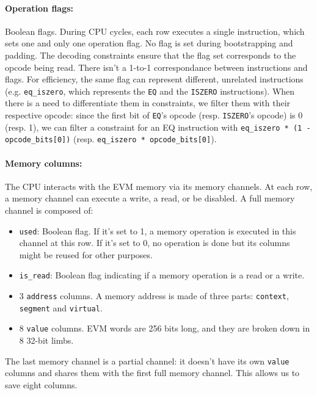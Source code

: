 \paragraph*{Operation flags:} Boolean flags. During CPU cycles, each row executes a single instruction, which sets one and only one operation flag. No flag is set during
bootstrapping and padding. The decoding constraints ensure that the flag set corresponds to the opcode being read.
There isn't a 1-to-1 correspondance between instructions and flags. For efficiency, the same flag can represent different, unrelated instructions (e.g. \texttt{eq\_iszero}, which represents
the \texttt{EQ} and the \texttt{ISZERO} instructions). When there is a need to differentiate them in constraints, we filter them with their respective opcode: since the first bit of \texttt{EQ}'s opcode
(resp. \texttt{ISZERO}'s opcode) is 0 (resp. 1), we can filter a constraint for an EQ instruction with \texttt{eq\_iszero * (1 - opcode\_bits[0])}
(resp. \texttt{eq\_iszero * opcode\_bits[0]}).

\paragraph*{Memory columns:} The CPU interacts with the EVM memory via its memory channels. At each row, a memory channel can execute a write, a read, or be disabled. A full memory channel is composed of:
\begin{itemize}
    \item  \texttt{used}: Boolean flag. If it's set to 1, a memory operation is executed in this channel at this row. If it's set to 0, no operation is done but its columns might be reused for other purposes.
    \item  \texttt{is\_read}: Boolean flag indicating if a memory operation is a read or a write.
    \item  3 \texttt{address} columns. A memory address is made of three parts: \texttt{context}, \texttt{segment} and \texttt{virtual}.
    \item  8 \texttt{value} columns. EVM words are 256 bits long, and they are broken down in 8 32-bit limbs.
\end{itemize}
The last memory channel is a partial channel: it doesn't have its own \texttt{value} columns and shares them with the first full memory channel. This allows us to save eight columns.
